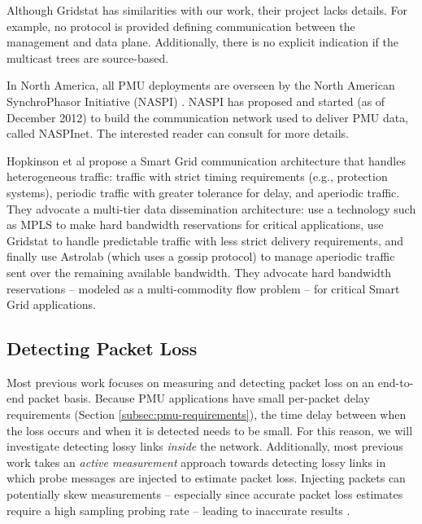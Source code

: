 Although Gridstat has similarities with our work, their project lacks details.  For example, no protocol is provided defining communication between the management and data plane. 
Additionally, there is no explicit indication if the multicast trees are source-based.

In North America, all PMU deployments are overseen by the North American SynchroPhasor Initiative (NASPI) \cite{Naspi10}.  NASPI has proposed and started (as of December 2012) to build the
communication network used to deliver PMU data, called NASPInet. The interested reader can consult \cite{Naspi10} for more details.


Hopkinson et al \cite{Hopkinson09} propose a Smart Grid communication architecture that handles heterogeneous traffic: traffic with strict timing requirements (e.g., protection systems), 
periodic traffic with greater tolerance for delay, and aperiodic traffic. They advocate a multi-tier data dissemination architecture: use a technology such as MPLS to make hard
bandwidth reservations for critical applications, use Gridstat to handle predictable traffic with less strict delivery requirements, and finally use Astrolab (which uses a gossip protocol) 
to manage aperiodic traffic sent over the remaining available bandwidth. They advocate hard bandwidth reservations -- modeled as a multi-commodity flow problem -- for critical Smart
Grid applications.




\subsection{Detecting Packet Loss} 

Most previous work \cite{Almes99,Caceres99,Friedl09} focuses on measuring and detecting packet loss on an end-to-end packet basis.
Because PMU applications have small per-packet delay requirements (Section \ref{subsec:pmu-requirements}), the time delay between when the loss occurs and when it is detected needs to be small.  
For this reason, we will investigate detecting lossy links \emph{inside} the network. 
Additionally, most previous work takes an \emph{active measurement} approach towards detecting lossy links in which probe messages are injected to estimate packet loss.  Injecting packets can
potentially skew measurements -- especially since accurate packet loss estimates require a high sampling probing rate -- leading to inaccurate results \cite{Barford04}. 



